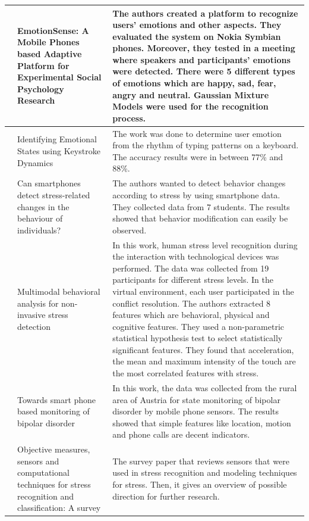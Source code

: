 \documentclass[12pt,oneandhalf,chaparabic,lfm,phd,eng,oneside,pntc]{gsufbe}
\begin{document}
\begin{longtable}[c]{| P{2cm} | P{3cm} | P{9cm} |}
\cite{rachuri2010emotionsense} & EmotionSense: A Mobile Phones based Adaptive Platform for Experimental Social Psychology Research & The authors created a platform to recognize users’ emotions and other aspects. They evaluated the system on Nokia Symbian phones. Moreover, they tested in a meeting where speakers and participants’ emotions were detected. There were 5 different types of emotions which are happy, sad, fear, angry and neutral. Gaussian Mixture Models were used for the recognition process. \\ \hline
\cite{epp2011identifying} & Identifying Emotional States using Keystroke Dynamics & The work was done to determine user emotion from the rhythm of typing patterns on a keyboard. The accuracy results were in between 77\% and 88\%. \\ \hline
\cite{bauer2012can} & Can smartphones detect stress-related changes in the behaviour of individuals? & The authors wanted to detect behavior changes according to stress by using smartphone data. They collected data from 7 students. The results showed that behavior modification can easily be observed. \\ \hline
\cite{carneiro2012multimodal} & Multimodal behavioral analysis for non-invasive stress detection & In this work, human stress level recognition during the interaction with technological devices was performed. The data was collected from 19 participants for different stress levels. In the virtual environment, each user participated in the conflict resolution. The authors extracted 8 features which are behavioral, physical and cognitive features. They used a non-parametric statistical hypothesis test to select statistically significant features. They found that acceleration, the mean and maximum intensity of the touch are the most correlated features with stress. \\ \hline
\cite{grunerbl2012towards} & Towards smart phone based monitoring of bipolar disorder & In this work, the data was collected from the rural area of Austria for state monitoring of bipolar disorder by mobile phone sensors. The results showed that simple features like location, motion and phone calls are decent indicators. \\ \hline
\cite{sharma2012objective} & Objective measures, sensors and computational techniques for stress recognition and classification: A survey & The survey paper that reviews sensors that were used in stress recognition and modeling techniques for stress. Then, it gives an overview of possible direction for further research. \\ \hline

\end{longtable}
\end{document}
